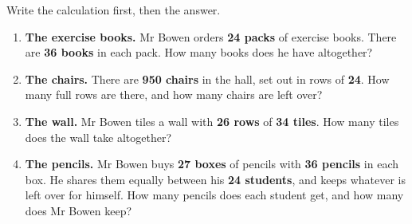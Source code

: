 \documentclass[12pt,a4paper]{article}
\newif\ifkey
\begin{document}
\noindent Write the calculation first, then the answer.

\begin{enumerate}[label=\textbf{\arabic*.}, itemsep=11pt]

  \item \textbf{The exercise books.} Mr Bowen orders \textbf{24 packs} of exercise
        books. There are \textbf{36 books} in each pack. How many books does he
        have altogether?
        \begin{workspace}[3.0cm]\end{workspace}

  \item \textbf{The chairs.} There are \textbf{950 chairs} in the hall, set out in
        rows of \textbf{24}. How many full rows are there, and how many chairs are
        left over?
        \begin{workspace}[3.0cm]\end{workspace}

  \item \textbf{The wall.} Mr Bowen tiles a wall with \textbf{26 rows} of
        \textbf{34 tiles}. How many tiles does the wall take altogether?
        \begin{workspace}[3.0cm]\end{workspace}

  \item \textbf{The pencils.} Mr Bowen buys \textbf{27 boxes} of pencils with
        \textbf{36 pencils} in each box. He shares them equally between his
        \textbf{24 students}, and keeps whatever is left over for himself. How
        many pencils does each student get, and how many does Mr Bowen keep?
        \begin{workspace}[5.2cm]\end{workspace}

\end{enumerate}

\ifkey
\newpage
{}

\linespread{1.0}\selectfont
{}
\end{document}
